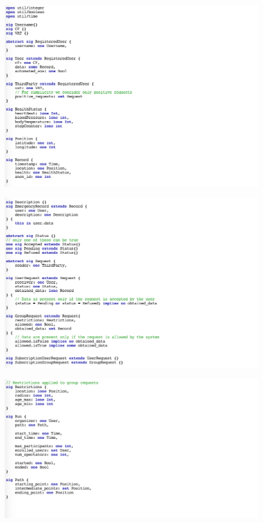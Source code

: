 \begin{figure}[H]
    \centering
    \includegraphics[scale=0.6]{rasdL/Pictures/alloy/model1.png}
\end{figure}
\begin{figure}[H]
    \centering
    \includegraphics[scale=0.55]{rasdL/Pictures/alloy/model2.png}
\end{figure}
\begin{figure}[H]
    \centering
    \includegraphics[scale=0.55]{rasdL/Pictures/alloy/model3.png}
\end{figure}
